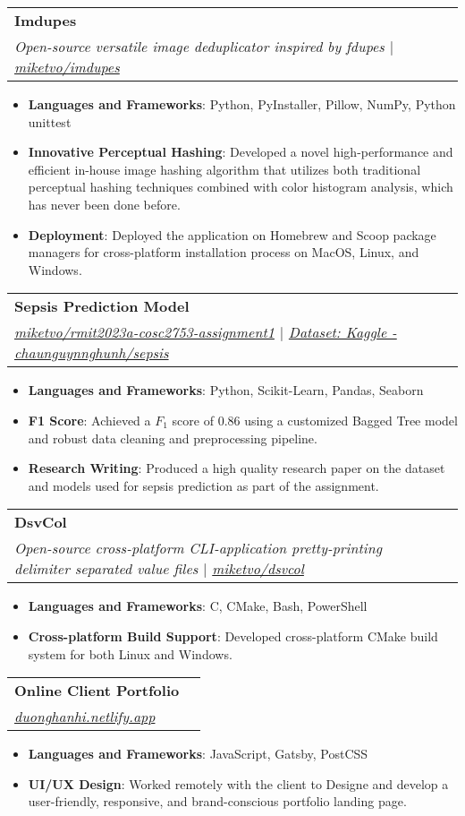 \documentclass[a4paper,11pt]{article}
\makeatletter
\newcommand{\resumeItem}[2]{
  \item\small{
    \textbf{#1}{: #2 \vspace{-2pt}}
  }
}
\newcommand{\resumeSubheading}[4]{
  \vspace{-2pt}\item
    \begin{tabular*}{0.97\textwidth}{l@{\extracolsep{\fill}}r}
      \textbf{#1} & #2 \\
      \textit{\small#3} & \textit{\small #4} \\
    \end{tabular*}\vspace{-6pt}
}
\newcommand{\resumeItemListStart}{\begin{itemize}}
\newcommand{\resumeItemListEnd}{\end{itemize}\vspace{-6pt}}
\makeatother
\begin{document}
    \resumeSubheading
      {Imdupes}{}
      {Open-source versatile image deduplicator inspired by fdupes $|$ \href{https://github.com/miketvo/imdupes}{\faGithub\space miketvo/imdupes}}{}
      \resumeItemListStart
        \resumeItem{Languages and Frameworks}
          {Python, PyInstaller, Pillow, NumPy, Python unittest}
        \resumeItem{Innovative Perceptual Hashing}
          {Developed a novel high-performance and efficient in-house image hashing algorithm that utilizes both traditional perceptual hashing techniques combined with color histogram analysis, which has never been done before.}
        \resumeItem{Deployment}
          {Deployed the application on Homebrew and Scoop package managers for cross-platform installation process on MacOS, Linux, and Windows.}
      \resumeItemListEnd

    \resumeSubheading
      {Sepsis Prediction Model}{}
      {\href{https://github.com/miketvo/rmit2023a-cosc2753-assignment1}{\faGithub\space miketvo/rmit2023a-cosc2753-assignment1} $|$ \href{https://www.kaggle.com/datasets/chaunguynnghunh/sepsis/}{\faDatabase\space Dataset: Kaggle - chaunguynnghunh/sepsis}}{}
      \resumeItemListStart
        \resumeItem{Languages and Frameworks}
          {Python, Scikit-Learn, Pandas, Seaborn}
        \resumeItem{F1 Score}
          {Achieved a $F_1$ score of 0.86 using a customized Bagged Tree model and robust data cleaning and preprocessing pipeline.}
        \resumeItem{Research Writing}
          {Produced a high quality research paper on the dataset and models used for sepsis prediction as part of the assignment.}
      \resumeItemListEnd

    \resumeSubheading
      {DsvCol}{}
      {Open-source cross-platform CLI-application pretty-printing delimiter separated value files $|$ \href{https://github.com/miketvo/dsvcol}{\faGithub\space miketvo/dsvcol}}{}
      \resumeItemListStart
        \resumeItem{Languages and Frameworks}
          {C, CMake, Bash, PowerShell}
        \resumeItem{Cross-platform Build Support}
          {Developed cross-platform CMake build system for both Linux and Windows.}
      \resumeItemListEnd

    \resumeSubheading
      {Online Client Portfolio}{}
      {\href{https://duonghanhi.netlify.app/}{\faGlobe\space duonghanhi.netlify.app}}{}
      \resumeItemListStart
        \resumeItem{Languages and Frameworks}
          {JavaScript, Gatsby, PostCSS}
        \resumeItem{UI/UX Design}
          {Worked remotely with the client to Designe and develop a user-friendly, responsive, and brand-conscious portfolio landing page.}
      \resumeItemListEnd
\end{document}
